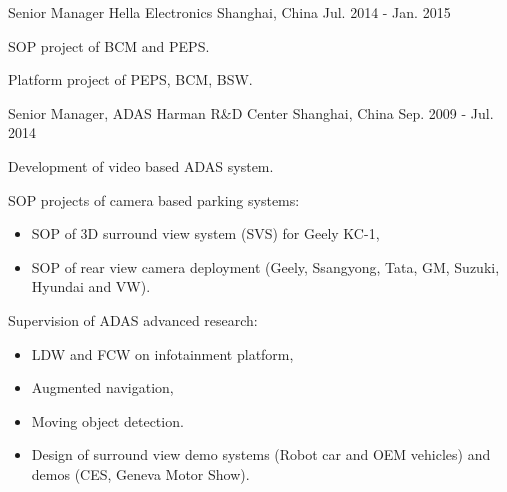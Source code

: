 \documentclass[../cv.tex]{subfiles}
\begin{document}
\begin{cventries}
  \cventry
    {Senior Manager} %
    {Hella Electronics} %
    {Shanghai, China} %
    {Jul. 2014 - Jan. 2015} %
    {
      \begin{cvitems}
        \item SOP project of BCM and PEPS.
        \item Platform project of PEPS, BCM, BSW.
      \end{cvitems}
    }

  \cventry
    {Senior Manager, ADAS} %
    {Harman R\&D Center} %
    {Shanghai, China} %
    {Sep. 2009 - Jul. 2014} %
    {
      \begin{cvitems}
        \item Development of video based ADAS system.
        \item SOP projects of camera based parking systems:
          \begin{itemize}
            \item SOP of 3D surround view system (SVS) for Geely KC-1,
            \item SOP of rear view camera deployment (Geely, Ssangyong, Tata, GM, Suzuki, Hyundai and VW).
           \end{itemize}
        \item Supervision of ADAS advanced research:
          \begin{itemize}
            \item LDW and FCW on infotainment platform,
            \item Augmented navigation,
            \item Moving object detection.
            \item Design of surround view demo systems (Robot car and OEM vehicles) and demos (CES, Geneva Motor Show).
          \end{itemize}
      \end{cvitems}
    }
\end{cventries}
\end{document}
